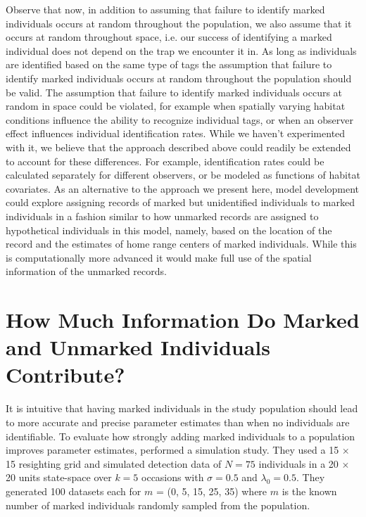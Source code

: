 Observe that now, in addition to assuming that failure to identify
marked individuals occurs at random throughout the population, we also
assume that it occurs at random throughout space, i.e. our success of
identifying a marked individual does not depend on the trap we
encounter it in. As long as individuals are identified based on the same type of tags
the assumption that failure to identify marked individuals occurs at
random throughout the population should be valid. The assumption that
failure to identify marked individuals occurs at random in space could
be violated, for example when spatially varying habitat conditions
influence the ability to recognize individual tags, or when an
observer effect influences individual identification rates. While we
haven't experimented with it, we believe that the approach
described above could readily be extended to account for these
differences. For example, identification rates could be calculated
separately for different observers, or be modeled as functions of
habitat covariates. As an alternative to the approach we present here,
model development could explore assigning records of marked but
unidentified individuals to marked individuals in a fashion similar to
how unmarked records are assigned to hypothetical individuals in this
model, namely, based on the location of the record and the estimates
of home range centers of marked individuals. While this is
computationally more advanced it would make full use of the spatial
information of the unmarked records.


\section{How Much Information Do Marked and Unmarked Individuals Contribute?}
\label{partialID.sec.info}
It is intuitive that having marked individuals in the study population should lead to more accurate and precise parameter estimates than when no individuals are identifiable. To evaluate how strongly adding marked individuals to a population improves parameter estimates, \citet{chandler_royle:2012} performed a simulation study. They used a 15 $\times$ 15 resighting grid and
simulated detection data of $N = 75$ individuals in a 20 $\times$ 20 units state-space over $k = 5$ occasions with
$\sigma = 0.5$ and $\lambda_0 = 0.5$. They generated 100 datasets each for
$m$ = (0, 5, 15, 25, 35) where $m$ is the known number of marked individuals randomly sampled from the population.


